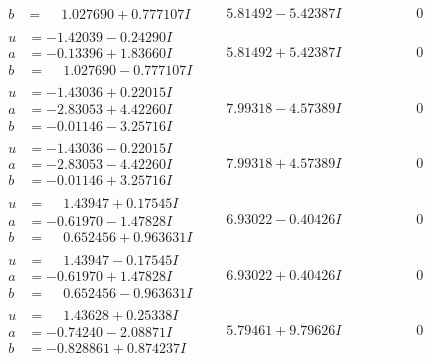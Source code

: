 \documentclass[1p]{elsarticle_modified}
\theoremstyle{definition}
\begin{document}
$$\begin{array}{c|c|c}
\begin{aligned}
b &= \phantom{-}1.027690 + 0.777107 I\end{aligned}
 & \phantom{-}5.81492 - 5.42387 I & \phantom{-0.000000 } 0 \\ \hline\begin{aligned}
u &= -1.42039 - 0.24290 I \\
a &= -0.13396 + 1.83660 I \\
b &= \phantom{-}1.027690 - 0.777107 I\end{aligned}
 & \phantom{-}5.81492 + 5.42387 I & \phantom{-0.000000 } 0 \\ \hline\begin{aligned}
u &= -1.43036 + 0.22015 I \\
a &= -2.83053 + 4.42260 I \\
b &= -0.01146 - 3.25716 I\end{aligned}
 & \phantom{-}7.99318 - 4.57389 I & \phantom{-0.000000 } 0 \\ \hline\begin{aligned}
u &= -1.43036 - 0.22015 I \\
a &= -2.83053 - 4.42260 I \\
b &= -0.01146 + 3.25716 I\end{aligned}
 & \phantom{-}7.99318 + 4.57389 I & \phantom{-0.000000 } 0 \\ \hline\begin{aligned}
u &= \phantom{-}1.43947 + 0.17545 I \\
a &= -0.61970 - 1.47828 I \\
b &= \phantom{-}0.652456 + 0.963631 I\end{aligned}
 & \phantom{-}6.93022 - 0.40426 I & \phantom{-0.000000 } 0 \\ \hline\begin{aligned}
u &= \phantom{-}1.43947 - 0.17545 I \\
a &= -0.61970 + 1.47828 I \\
b &= \phantom{-}0.652456 - 0.963631 I\end{aligned}
 & \phantom{-}6.93022 + 0.40426 I & \phantom{-0.000000 } 0 \\ \hline\begin{aligned}
u &= \phantom{-}1.43628 + 0.25338 I \\
a &= -0.74240 - 2.08871 I \\
b &= -0.828861 + 0.874237 I\end{aligned}
 & \phantom{-}5.79461 + 9.79626 I & \phantom{-0.000000 } 0 \\ \hline\begin{aligned}

\end{aligned}
\end{array}$$
\end{document}
